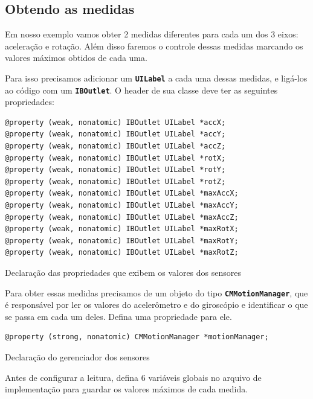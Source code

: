 \documentclass[a4paper,12pt,brazil,doubleside]{book}
\begin{document}
\begin{singlespace}
\subsection{Obtendo as medidas}

Em nosso exemplo vamos obter 2 medidas diferentes para cada um dos 3 eixos: aceleração e rotação. Além disso faremos o controle dessas medidas marcando os valores máximos obtidos de cada uma.

Para isso precisamos adicionar um \texttt{\textbf{UILabel}} a cada uma dessas medidas, e ligá-los ao código com um \texttt{\textbf{IBOutlet}}. O header de sua classe deve ter as seguintes propriedades:

\begin{listing}[H]
\begin{verbatim}
@property (weak, nonatomic) IBOutlet UILabel *accX;
@property (weak, nonatomic) IBOutlet UILabel *accY;
@property (weak, nonatomic) IBOutlet UILabel *accZ;
@property (weak, nonatomic) IBOutlet UILabel *rotX;
@property (weak, nonatomic) IBOutlet UILabel *rotY;
@property (weak, nonatomic) IBOutlet UILabel *rotZ;
@property (weak, nonatomic) IBOutlet UILabel *maxAccX;
@property (weak, nonatomic) IBOutlet UILabel *maxAccY;
@property (weak, nonatomic) IBOutlet UILabel *maxAccZ;
@property (weak, nonatomic) IBOutlet UILabel *maxRotX;
@property (weak, nonatomic) IBOutlet UILabel *maxRotY;
@property (weak, nonatomic) IBOutlet UILabel *maxRotZ;
\end{verbatim}
\caption{Declaração das propriedades que exibem os valores dos sensores}
\end{listing}


Para obter essas medidas precisamos de um objeto do tipo \texttt{\textbf{CMMotionManager}}, que é responsável por ler os valores do acelerômetro e do giroscópio e identificar o que se passa em cada um deles. Defina uma propriedade para ele.

\begin{listing}[H]
\begin{verbatim}
@property (strong, nonatomic) CMMotionManager *motionManager;
\end{verbatim}
\caption{Declaração do gerenciador dos sensores}
\end{listing}


Antes de configurar a leitura, defina 6 variáveis globais no arquivo de implementação para guardar os valores máximos de cada medida.


\end{singlespace}
\end{document}
